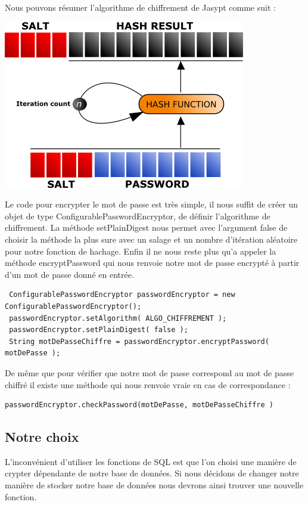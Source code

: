Nous pouvons résumer l'algorithme de chiffrement de Jasypt comme suit :\\
\begin{center}
\includegraphics[scale=0.5]{../graph/passwordEncryption.png} \\
\end{center}
Le code pour encrypter le mot de passe est très simple, il nous suffit de créer un objet de type ConfigurablePasswordEncryptor, de définir l'algorithme de chiffrement. La méthode setPlainDigest nous permet avec l'argument false de choisir la méthode la plus sure avec un salage et un nombre d'itération aléatoire pour notre fonction de hachage. Enfin il ne nous reste plus qu'a appeler la méthode encryptPassword qui nous renvoie notre mot de passe encrypté à partir d'un mot de passe donné en entrée. 
\begin{lstlisting}
 ConfigurablePasswordEncryptor passwordEncryptor = new ConfigurablePasswordEncryptor();
 passwordEncryptor.setAlgorithm( ALGO_CHIFFREMENT );
 passwordEncryptor.setPlainDigest( false );
 String motDePasseChiffre = passwordEncryptor.encryptPassword( motDePasse );
\end{lstlisting} 


De même que pour vérifier que notre mot de passe correspond au mot de passe chiffré il existe une méthode qui nous renvoie vraie en cas de correspondance :

\begin{lstlisting}
passwordEncryptor.checkPassword(motDePasse, motDePasseChiffre )
\end{lstlisting}


\subsection{Notre choix}
L'inconvénient d'utiliser les fonctions de SQL est que l'on choisi une manière de crypter dépendante de notre base de données. Si nous décidons de changer notre manière de stocker notre base de données nous devrons ainsi trouver une nouvelle fonction. \\

